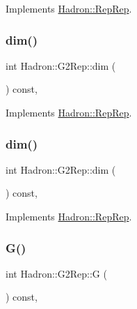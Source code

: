 Implements \mbox{\hyperlink{structHadron_1_1RepRep_a92c8802e5ed7afd7da43ccfd5b7cd92b}{Hadron\+::\+Rep\+Rep}}.

\mbox{\label{structHadron_1_1G2Rep_a7c8d894ff5da6fead1964484c04a4c80}} 
\subsubsection{\texorpdfstring{dim()}{dim()}\hspace{0.1cm}{\footnotesize\ttfamily [2/3]}}
{\footnotesize\ttfamily int Hadron\+::\+G2\+Rep\+::dim (\begin{DoxyParamCaption}{ }\end{DoxyParamCaption}) const\hspace{0.3cm}{\ttfamily [inline]}, {\ttfamily [virtual]}}



Implements \mbox{\hyperlink{structHadron_1_1RepRep_a92c8802e5ed7afd7da43ccfd5b7cd92b}{Hadron\+::\+Rep\+Rep}}.

\mbox{\label{structHadron_1_1G2Rep_a7c8d894ff5da6fead1964484c04a4c80}} 
\subsubsection{\texorpdfstring{dim()}{dim()}\hspace{0.1cm}{\footnotesize\ttfamily [3/3]}}
{\footnotesize\ttfamily int Hadron\+::\+G2\+Rep\+::dim (\begin{DoxyParamCaption}{ }\end{DoxyParamCaption}) const\hspace{0.3cm}{\ttfamily [inline]}, {\ttfamily [virtual]}}



Implements \mbox{\hyperlink{structHadron_1_1RepRep_a92c8802e5ed7afd7da43ccfd5b7cd92b}{Hadron\+::\+Rep\+Rep}}.

\mbox{\label{structHadron_1_1G2Rep_ad27dff08ddb0fa10f2dc503f47cdd766}} 
\subsubsection{\texorpdfstring{G()}{G()}\hspace{0.1cm}{\footnotesize\ttfamily [1/2]}}
{\footnotesize\ttfamily int Hadron\+::\+G2\+Rep\+::G (\begin{DoxyParamCaption}{ }\end{DoxyParamCaption}) const\hspace{0.3cm}{\ttfamily [inline]}, {\ttfamily [virtual]}}

